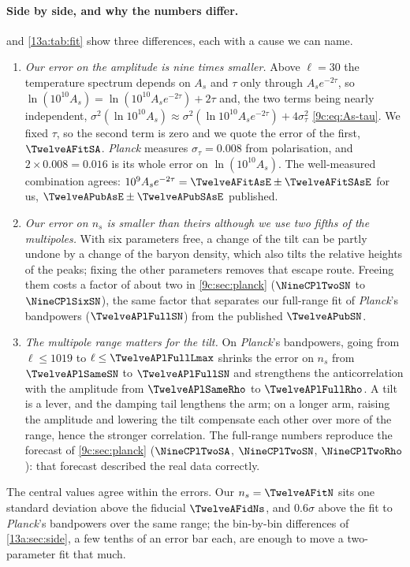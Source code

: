 \paragraph{Side by side, and why the numbers differ.}  and \cref{13a:tab:fit} show three differences, each with
a cause we can name.
\begin{enumerate}[itemsep=3pt,leftmargin=1.5em]
  \item \emph{Our error on the amplitude is nine times smaller.} Above $\ell=30$ the temperature spectrum depends on $A_s$ and $\tau$
        only through $A_se^{-2\tau}$, so $\ln(10^{10}A_s)=\ln(10^{10}A_se^{-2\tau})+2\tau$ and, the two terms being nearly
        independent, $\sigma^2(\ln10^{10}A_s)\approx\sigma^2(\ln10^{10}A_se^{-2\tau})+4\sigma_\tau^2$ \eqref{9c:eq:As-tau}. We fixed
        $\tau$, so the second term is zero and we quote the error of the first, $\TwelveAFitSA$. \textit{Planck} measures
        $\sigma_\tau=0.008$ from polarisation, and $2\times0.008=0.016$ is its whole error on $\ln(10^{10}A_s)$. The well-measured
        combination agrees: $10^9A_se^{-2\tau}=\TwelveAFitAsE\pm\TwelveAFitSAsE$ for us, $\TwelveAPubAsE\pm\TwelveAPubSAsE$ published.
  \item \emph{Our error on $n_s$ is smaller than theirs although we use two fifths of the multipoles.} With six parameters free, a change of
        the tilt can be partly undone by a change of the baryon density, which also tilts the relative heights of the peaks; fixing the
        other parameters removes that escape route. Freeing them costs a factor of about two in \cref{9c:sec:planck} ($\NineCPlTwoSN$ to
        $\NineCPlSixSN$), the same factor that separates our full-range fit of \textit{Planck}'s bandpowers ($\TwelveAPlFullSN$) from the
        published $\TwelveAPubSN$.
  \item \emph{The multipole range matters for the tilt.} On \textit{Planck}'s bandpowers, going from $\ell\le1019$ to $\ell\le\TwelveAPlFullLmax$
        shrinks the error on $n_s$ from $\TwelveAPlSameSN$ to $\TwelveAPlFullSN$ and strengthens the anticorrelation with the amplitude from
        $\TwelveAPlSameRho$ to $\TwelveAPlFullRho$. A tilt is a lever, and the damping tail lengthens the arm; on a longer arm, raising the amplitude
        and lowering the tilt compensate each other over more of the range, hence the stronger correlation. The full-range numbers reproduce
        the forecast of \cref{9c:sec:planck} ($\NineCPlTwoSA$, $\NineCPlTwoSN$, $\NineCPlTwoRho$): that forecast described the real data correctly.
\end{enumerate}
The central values agree within the errors. Our $n_s=\TwelveAFitN$ sits one standard deviation above the fiducial $\TwelveAFidNs$, and
$0.6\sigma$ above the fit to \textit{Planck}'s bandpowers over the same range; the bin-by-bin differences of \cref{13a:sec:side}, a few tenths of
an error bar each, are enough to move a two-parameter fit that much.

